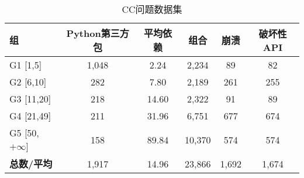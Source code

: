 \begin{table}[htbp]
	\centering
	\begin{threeparttable}
		\caption{CC问题数据集}
		\label{tab:CC}
		\begin{tabularx}{0.95\textwidth}{Xccccc}
			\toprule
			\textbf{组}&\textbf{Python第三方包}&\textbf{平均依赖}&\textbf{组合}&\textbf{崩溃}&\textbf{破坏性API} \\
			\midrule
			G1 [1,5]&1,048&2.24&2,234&89&82\\
			G2 [6,10]&282&7.80&2,189&261&255\\
			G3 [11,20]&218&14.60&2,322&91&89\\
			G4 [21,49]&211&31.96&6,751&677&674\\
			G5 [50,$+\infty$]&158&89.84&10,370&574&574\\
			\midrule
			\textbf{总数/平均} &1,917&14.96&23,866&1,692&1,674\\
			\bottomrule
		\end{tabularx}
	\end{threeparttable}
\end{table}